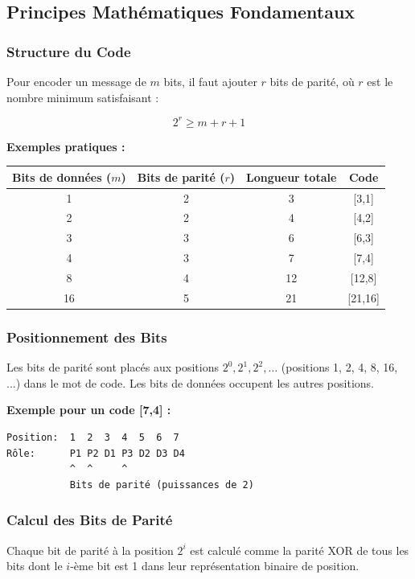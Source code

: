 \documentclass[12pt, a4paper]{article}
\begin{document}
\subsection{Principes Mathématiques Fondamentaux}

\subsubsection{Structure du Code}

Pour encoder un message de $m$ bits, il faut ajouter $r$ bits de parité, où $r$ est le nombre minimum satisfaisant :

$$2^r \geq m + r + 1$$

\textbf{Exemples pratiques :}
\begin{center}
\begin{tabular}{|c|c|c|c|}
\hline
Bits de données ($m$) & Bits de parité ($r$) & Longueur totale & Code \\
\hline
1 & 2 & 3 & [3,1] \\
2 & 2 & 4 & [4,2] \\
3 & 3 & 6 & [6,3] \\
4 & 3 & 7 & [7,4] \\
8 & 4 & 12 & [12,8] \\
16 & 5 & 21 & [21,16] \\
\hline
\end{tabular}
\end{center}

\subsubsection{Positionnement des Bits}

Les bits de parité sont placés aux positions $2^0, 2^1, 2^2, \ldots$ (positions 1, 2, 4, 8, 16, ...) dans le mot de code. Les bits de données occupent les autres positions.

\textbf{Exemple pour un code [7,4] :}
\begin{verbatim}
Position:  1  2  3  4  5  6  7
Rôle:      P1 P2 D1 P3 D2 D3 D4
           ^  ^     ^
           Bits de parité (puissances de 2)
\end{verbatim}

\subsubsection{Calcul des Bits de Parité}

Chaque bit de parité à la position $2^i$ est calculé comme la parité XOR de tous les bits dont le $i$-ème bit est 1 dans leur représentation binaire de position.
\end{document}
